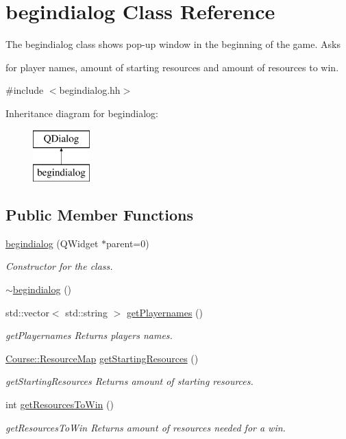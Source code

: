 \hypertarget{classbegindialog}{\section{begindialog Class Reference}
\label{classbegindialog}
}


The begindialog class shows pop-\/up window in the beginning of the game. Asks \par
for player names, amount of starting resources and amount of resources to win.  




{\ttfamily \#include $<$begindialog.\-hh$>$}

Inheritance diagram for begindialog\-:\begin{figure}[H]
\begin{center}
\leavevmode
\includegraphics[height=2.000000cm]{classbegindialog}
\end{center}
\end{figure}
\subsection*{Public Member Functions}
\begin{DoxyCompactItemize}
\item 
\hyperlink{classbegindialog_a76bb9418e0b00fbb94c2cef459a83b08}{begindialog} (Q\-Widget $\ast$parent=0)
\begin{DoxyCompactList}\small\item\em Constructor for the class. \end{DoxyCompactList}\item 
\hyperlink{classbegindialog_a83236454b5fab5d4fee1ef0c6f0307eb}{$\sim$begindialog} ()
\item 
std\-::vector$<$ std\-::string $>$ \hyperlink{classbegindialog_a3614bf1959c37603e094d39640190123}{get\-Playernames} ()
\begin{DoxyCompactList}\small\item\em get\-Playernames Returns players names. \end{DoxyCompactList}\item 
\hyperlink{namespaceCourse_ab9a46ed9cd00485e318e5731ea2f78d9}{Course\-::\-Resource\-Map} \hyperlink{classbegindialog_a1fdc4bd90ddc27df8064bea149b14fbf}{get\-Starting\-Resources} ()
\begin{DoxyCompactList}\small\item\em get\-Starting\-Resources Returns amount of starting resources. \end{DoxyCompactList}\item 
int \hyperlink{classbegindialog_a0a0d98c8c33dc11b35293a9d6104e2d6}{get\-Resources\-To\-Win} ()
\begin{DoxyCompactList}\small\item\em get\-Resources\-To\-Win Returns amount of resources needed for a win. \end{DoxyCompactList}\end{DoxyCompactItemize}
